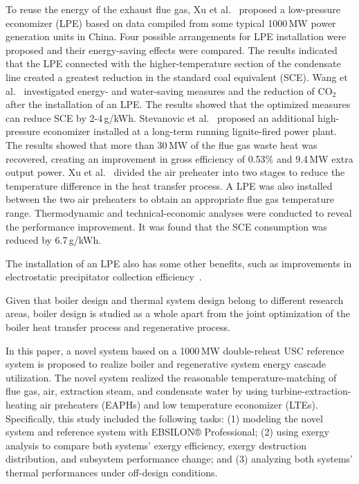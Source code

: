 \documentclass[preprint,12pt]{elsarticle}
\begin{document}
To reuse the energy of the exhaust flue gas, Xu et al.~\cite{Xu2013Techno} proposed a low-pressure economizer (LPE) based on data compiled from some typical 1000\,MW power generation units in China. 
Four possible arrangements for LPE installation were proposed and their energy-saving effects were compared.
The results indicated that the LPE connected with the higher-temperature section of the condensate line created a greatest reduction in the standard coal equivalent (SCE).  
Wang et al.~\cite{Wang2012Application} investigated energy- and water-saving measures and the reduction of CO$_2$ after the installation of an LPE.
The results showed that the optimized measures can reduce SCE by 2-4\,g/kWh.
Stevanovic et al.~\cite{Stevanovic2014Efficiency} proposed an additional high-pressure economizer installed at a long-term running lignite-fired power plant.
The results showed that more than 30\,MW of the flue gas waste heat was recovered, creating an improvement in gross efficiency of 0.53\% and 9.4\,MW extra output power.
Xu et al.~\cite{Xu2013A} divided the air preheater into two stages to reduce the temperature difference in the heat transfer process.
A LPE was also installed between the two air preheaters to obtain an appropriate flue gas temperature range.
Thermodynamic and technical-economic analyses were conducted to reveal the performance improvement.
It was found that the SCE consumption was reduced by 6.7\,g/kWh.

The installation of an LPE also has some  other benefits, such as improvements in electrostatic precipitator collection efficiency~\cite{Li2016Low}.

Given that boiler design and thermal system design belong to different research areas, boiler design is studied as a whole apart from the joint optimization of the boiler heat transfer process and regenerative process.

In this paper, a novel system based on a 1000\,MW double-reheat USC reference system is proposed to realize boiler and regenerative system energy cascade utilization. 
The novel system realized the reasonable temperature-matching of flue gas, air, extraction steam, and condensate water by using turbine-extraction-heating air preheaters (EAPHs) and low temperature economizer (LTEs).
Specifically, this study included the following tasks: (1) modeling the novel system and reference system with EBSILON® Professional; (2) using exergy analysis to compare both systems' exergy efficiency, exergy destruction distribution, and subsystem performance change; and (3) analyzing both systems' thermal performances under off-design conditions.
\end{document}
